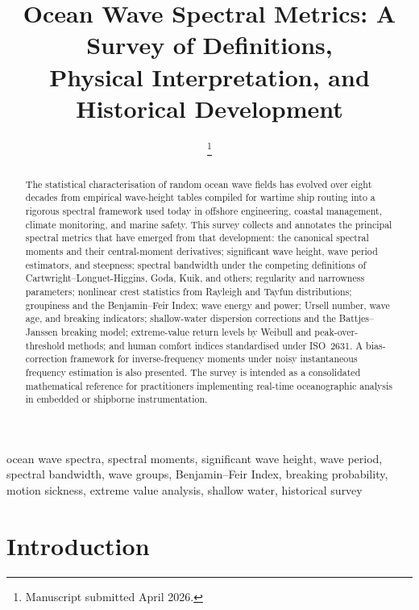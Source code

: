 \documentclass[journal]{IEEEtran}
\title{Ocean Wave Spectral Metrics: A Survey of Definitions,\\
Physical Interpretation, and Historical Development}
\author{%
    \IEEEauthorblockN{Mikhail S.\ Grushinskiy}
    \IEEEauthorblockA{Independent Researcher,
        Bareboat Necessities Project,
        \texttt{mgrouch@users.github.com}}
    \thanks{Manuscript submitted April 2026.}
}
\begin{document}
    \maketitle

    \begin{abstract}
        The statistical characterisation of random ocean wave fields has
        evolved over eight decades from empirical wave-height tables compiled
        for wartime ship routing into a rigorous spectral framework used today
        in offshore engineering, coastal management, climate monitoring, and
        marine safety.
        This survey collects and annotates the principal spectral metrics that
        have emerged from that development: the canonical spectral moments and
        their central-moment derivatives; significant wave height, wave period
        estimators, and steepness; spectral bandwidth under the competing
        definitions of Cartwright--Longuet-Higgins, Goda, Kuik, and others;
        regularity and narrowness parameters; nonlinear crest statistics from
        Rayleigh and Tayfun distributions; groupiness and the Benjamin--Feir
        Index; wave energy and power; Ursell number, wave age, and breaking
        indicators; shallow-water dispersion corrections and the
        Battjes--Janssen breaking model; extreme-value return levels by
        Weibull and peak-over-threshold methods; and human comfort indices
        standardised under ISO~2631.
        A bias-correction framework for inverse-frequency moments under noisy
        instantaneous frequency estimation is also presented.
        The survey is intended as a consolidated mathematical reference for
        practitioners implementing real-time oceanographic analysis in embedded
        or shipborne instrumentation.
    \end{abstract}

    \begin{IEEEkeywords}
        ocean wave spectra, spectral moments, significant wave height,
        wave period, spectral bandwidth, wave groups, Benjamin--Feir Index,
        breaking probability, motion sickness, extreme value analysis,
        shallow water, historical survey
    \end{IEEEkeywords}

    \section{Introduction}
\end{document}
